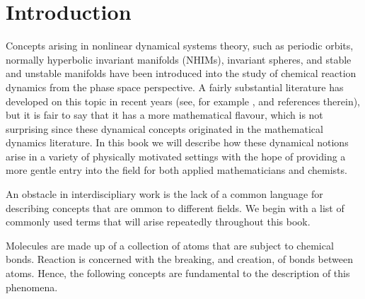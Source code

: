 \documentclass{article}
\begin{document}
\section*{Introduction}

Concepts arising in nonlinear dynamical systems theory, such as periodic orbits, normally hyperbolic invariant manifolds (NHIMs), invariant spheres, and stable and unstable manifolds  have been introduced into the study of chemical reaction dynamics from the phase space perspective. A fairly substantial literature has developed on this topic in recent years (see, for example \cite{wiggins2016role, waalkens2010geometrical, waalkens2007wigner,wiggins2013normally}, and references therein), but it is fair to say that it has a more mathematical flavour, which is not surprising since these dynamical concepts originated in the  mathematical dynamics literature. In this book we will  describe how these dynamical  notions arise  in a variety of physically motivated settings with the hope of providing a more gentle entry into the field for both applied mathematicians and chemists.

An obstacle in interdiscipliary work is the lack of a common language for describing concepts that are ommon to different fields. We begin with a list of commonly used terms that will arise repeatedly throughout this book.




Molecules are made up of a collection of atoms that are subject to chemical bonds. Reaction is concerned with the breaking, and creation, of bonds between atoms.  Hence, the following concepts are fundamental to the description of this phenomena. 
\end{document}
